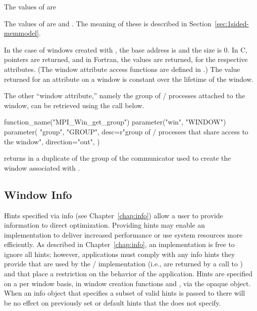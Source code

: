 The values of  are
\begin{constlist}
\end{constlist}

The values of  are 
and .  The meaning of these is described in
Section~\ref{sec:1sided-memmodel}.

In the case of windows created with
, the base address is
 and the size is $0$. In C, pointers 
are returned, and in Fortran, the
values are returned, for the respective attributes.
(The window attribute access functions are defined in
.)
The value returned for an attribute on a window is constant
over the lifetime of the window. 

The other ``window attribute,'' namely the group of \mpi/ processes attached
to the window, can be retrieved using the call below.

%
%
\begin{mpi-binding}
    function_name("MPI_Win_get_group")
    parameter("win", "WINDOW")
    parameter(
        "group",
        "GROUP",
        desc=r"group of \mpi/ processes that share access to the window",
        direction="out",
    )
\end{mpi-binding}

 returns in 
a duplicate of the group
of the communicator used to create the window
associated with .

\subsection{Window Info}
\label{subsec:window-info}

Hints specified via info
(see Chapter~\ref{chap:info})
allow a user to provide information
to direct optimization.
Providing hints may enable an implementation to deliver increased
performance or use system resources more efficiently.
As described in Chapter~\ref{chap:info},
an implementation is free to ignore all hints; however, applications
must comply with any info hints they provide that are used by the \MPI/
implementation (i.e., are returned by a call to
) and that place a restriction on the
behavior of the application.
Hints are specified on a per window basis,
in window creation functions and ,
via the opaque  object.
When an info object that specifies a subset of valid hints is passed to
there will be no effect on
previously set or default hints that the  does not specify. 

